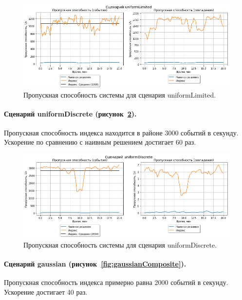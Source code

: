 \documentclass[14pt]{article}
\begin{document}
\begin{figure}[h!]
    \centering
    \includegraphics[width=1\textwidth]{images/composite/uniformLimitedComposite.png}
    \caption{Пропускная способность системы для сценария uniformLimited.}
    \label{fig:uniformLimitedComposite}
\end{figure}

\paragraph{Сценарий uniformDiscrete (рисунок~\ref{fig:uniformDiscreteComposite}).} Пропускная способность индекса находится в районе 3000 событий в секунду. Ускорение по сравнению с наивным решением достигает 60 раз.

\begin{figure}[h!]
    \centering
    \includegraphics[width=1\textwidth]{images/composite/uniformDiscreteComposite.png}
    \caption{Пропускная способность системы для сценария uniformDiscrete.}
    \label{fig:uniformDiscreteComposite}
\end{figure}

\paragraph{Сценарий gaussian (рисунок~\ref{fig:gaussianComposite}).} Пропускная способность индекса примерно равна 2000 событий в секунду. Ускорение достигает 40 раз.
\end{document}
